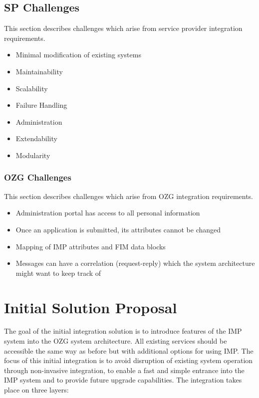 \documentclass[
     12pt,         %
     a4paper,      %
     BCOR=10mm,version=first,     %
     DIV=14,version=first,        %
     ]{scrreprt}
\begin{document}
\section{SP Challenges}

This section describes challenges which arise from service provider integration requirements.

\begin{itemize}
    \item Minimal modification of existing systems
    \item Maintainability
    \item Scalability
    \item Failure Handling
    \item Administration
    \item Extendability
    \item Modularity
    
\end{itemize}

\subsection{OZG Challenges}

This section describes challenges which arise from OZG integration requirements.

\begin{itemize}
    \item Administration portal has access to all personal information
    \item Once an application is submitted, its attributes cannot be changed
    \item Mapping of IMP attributes and FIM data blocks
    \item Messages can have a correlation (request-reply) which the system architecture might want to keep track of
\end{itemize}

\chapter{Initial Solution Proposal}

The goal of the initial integration solution is to introduce features of the IMP system into the OZG system architecture. All existing services should be accessible the same way as before but with additional options for using IMP. The focus of this initial integration is to avoid disruption of existing system operation through non-invasive integration, to enable a fast and simple entrance into the IMP system and to provide future upgrade capabilities. The integration takes place on three layers:
\end{document}
